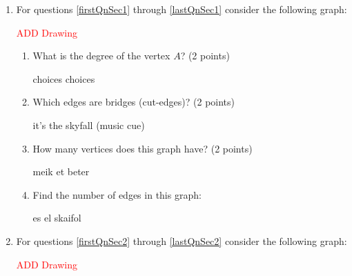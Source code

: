 \documentclass[12pt]{exam}
\begin{document}
\begin{enumerate} 

\item For questions \ref{firstQnSec1} through \ref{lastQnSec1} consider the following graph:\par

\textcolor{red}{ADD Drawing}

\begin{enumerate}
    \item \label{firstQnSec1} What is the degree of the vertex $A$? (2 points)
    \begin{checkboxes}
        \choice choices choices
    \end{checkboxes}
    \vfill
    \item Which edges are bridges (cut-edges)? (2 points)
    \begin{checkboxes}
        \choice it's the skyfall (music cue)
    \end{checkboxes}
    \vfill
    \item How many vertices does this graph have? (2 points)
    \begin{checkboxes}
        \choice meik et beter
    \end{checkboxes}
    \vfill
    \item \label{lastQnSec1} Find the number of edges in this graph:
    \begin{checkboxes}
        \choice es el skaifol
    \end{checkboxes}
    \vfill
\end{enumerate}
\item For questions \ref{firstQnSec2} through \ref{lastQnSec2} consider the following graph:\par

\textcolor{red}{ADD Drawing}


\end{enumerate}
\end{document}
